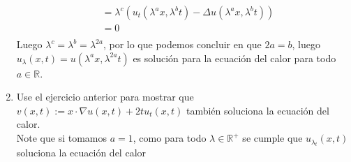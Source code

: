 \begin{homeworkProblem}
\begin{solucion}
\begin{enumerate}
\begin{align*}
          &=\lambda^c(u_{t}(\lambda^ax,\lambda^bt)-\Delta u(\lambda^ax,\lambda^bt))\\
          &=0\\
        \end{align*}
        Luego $\lambda^c=\lambda^b=\lambda^{2a}$, por lo que podemos concluir en que $2a=b$, luego $u_{\lambda}(x,t)=u(\lambda^{a}x,\lambda^{2a}t)$ es solución para la ecuación del calor para todo $a\in \mathbb{R}$.
        \demostrado
      \item Use el ejercicio anterior para mostrar que $v(x,t):=x\cdot \nabla u(x,t)+2tu_t(x,t)$ también soluciona la ecuación del calor.\\
        Note que si tomamos $a=1$, como para todo $\lambda\in\mathbb{R}^{+}$ se cumple que $u_{\lambda_{t}}(x,t)$ soluciona la ecuación del calor 
    \end{enumerate}
    \demostrado
  \end{solucion}  
\end{homeworkProblem}
